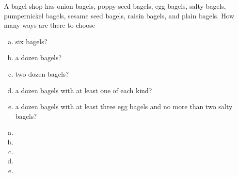 \documentclass[../main.tex]{subfiles}
\begin{document}
A bagel shop has onion bagels, poppy seed bagels, egg bagels, salty bagels, pumpernickel bagels, sesame seed bagels, raisin bagels, and plain bagels.
How many ways are there to choose
\begin{enumerate}[a)]
	\item six bagels?
	\item a dozen bagels?
	\item two dozen bagels?
	\item a dozen bagels with at least one of each kind?
	\item a dozen bagels with at least three egg bagels and no more than two salty bagels?
\end{enumerate}

\solution
\begin{enumerate}[a)]
	\item 
	\item 
	\item 
	\item 
	\item 
\end{enumerate}
\end{document}
